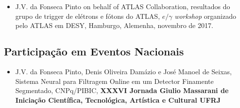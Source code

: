 \begin{itemize}
\item  J.V. da Fonseca Pinto  on behalf of ATLAS Collaboration, resultados do grupo de trigger de elétrons e fótons do ATLAS, $e/\gamma$ \emph{workshop} organizado pelo ATLAS em DESY, Hamburgo, Alemenha, novembro de 2017. 
\end{itemize}



\subsection{Participação em Eventos Nacionais}


\begin{itemize}

\item J.V. da Fonseca Pinto, Denis Oliveira Damázio e José Manoel de Seixas, Sistema Neural para Filtragem Online em um Detector Finamente Segmentado, CNPq/PIBIC, \textbf{XXXVI Jornada Giulio Massarani de Iniciação Científica, Tecnológica, Artística e Cultural UFRJ}





\end{itemize}


